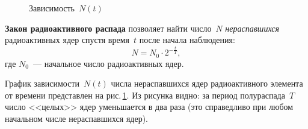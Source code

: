 \documentclass[main.tex]{subfiles}
\begin{document}

{%
\setlength\intextsep{0pt}
\begin{figure}
    \centering
    \caption{Зависимость~$N(t)$}
    \label{fig:p206}
\end{figure}

\textbf{Закон радиоактивного распада} позволяет найти число~$N$ \emph{нераспавшихся} радиоактивных ядер спустя время~$t$ после начала наблюдения:
\begin{equation}
    N=N_0\cdot2^{-\tfrac{t}{T}},
\end{equation}
где $N_0$~--- начальное число радиоактивных ядер.


График зависимости~$N(t)$ числа нераспавшихся ядер радиоактивного элемента от времени представлен на рис.\,\ref{fig:p206}. Из рисунка видно: за период полураспада~$T$ число <<целых>> ядер уменьшается в два раза (это справедливо при любом начальном числе нераспавшихся ядер).














}
\end{document}
